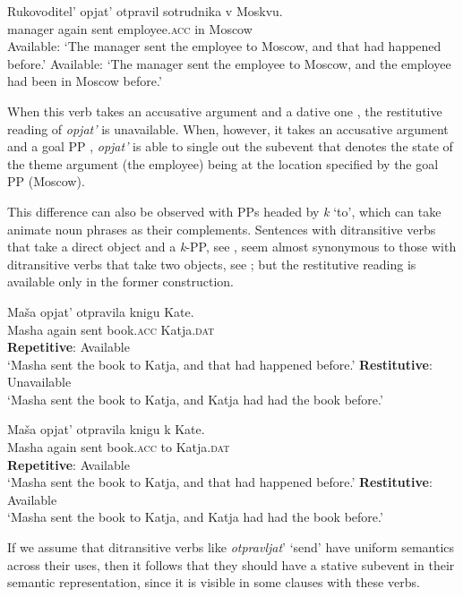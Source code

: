 \documentclass[output=paper]{langscibook}
\begin{document}
 \ea\label{ex:bondarenko:22}
\gll Rukovoditel’ opjat’ otpravil sotrudnika v Moskvu.\\
     manager again sent employee.\textsc{acc} in Moscow\\
\ea     Available: `The manager sent the employee to Moscow, and that had   happened before.'
\ex     Available: `The manager sent the employee to Moscow, and the employee   had been in   Moscow before.'
\z
\z


\noindent When this verb takes an accusative argument and a dative one , the restitutive reading of \textit{opjat’} is unavailable. When, however, it takes an accusative argument and a goal PP , \textit{opjat’} is able to single out the subevent that denotes the state of the theme argument (the employee) being at the location specified by the goal PP (Moscow).


This difference can also be observed with PPs headed by \textit{k} ‘to’, which can take animate noun phrases as their complements. Sentences with ditransitive verbs that take a direct object and a \textit{k}{}-PP, see , seem almost synonymous to those with ditransitive verbs that take two objects, see ; but the restitutive reading is available only in the former construction.


 \ea\label{ex:bondarenko:23}
\gll Maša opjat’ otpravila knigu Kate.\\
     Masha again sent book.\textsc{acc} Katja.\textsc{dat}\\
\ea \textbf{Repetitive}: Available\\
`Masha sent the book to Katja, and that had happened before.'
\ex \textbf{Restitutive}: Unavailable\\
`Masha sent the book to Katja, and Katja had had the book   before.'
\z
\z

 \ea\label{ex:bondarenko:24}
\gll Maša opjat’ otpravila knigu k Kate.\\
     Masha again sent book.\textsc{acc} to Katja.\textsc{dat}\\
\ea \textbf{Repetitive}: Available\\
`Masha sent the book to Katja, and that had happened before.'
\ex \textbf{Restitutive}: Available\\
`Masha sent the book to Katja, and Katja had had the book   before.'
\z
\z


\noindent If we assume that ditransitive verbs like \textit{otpravljat}’ ‘send’ have uniform semantics across their uses, then it follows that they should have a stative subevent in their semantic representation, since it is visible in some clauses with these verbs.
\end{document}
